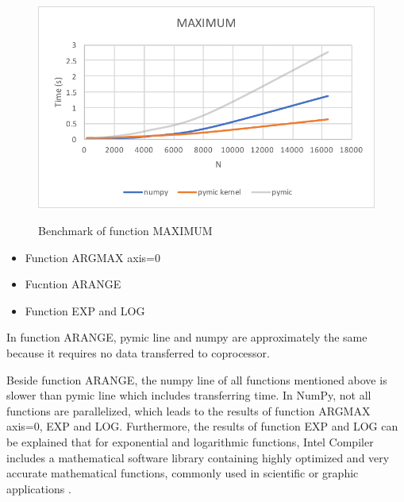  \begin{figure}
 \centering
 \includegraphics[scale=0.5]{img/group2/maximum.pdf}
 \label{fig:group2}
 \caption{Benchmark of function MAXIMUM}
 \end{figure}

\begin{itemize}
	\item Function ARGMAX axis=0
	\item Fucntion ARANGE
	\item Function EXP and LOG
\end{itemize}

In function ARANGE, pymic line and numpy are approximately the same because it requires no data transferred to coprocessor. 

Beside function ARANGE, the numpy line of all functions mentioned above is slower than pymic line which includes transferring time. In NumPy, not all functions are parallelized, which leads to the results of function ARGMAX axis=0, EXP and LOG. Furthermore, the results of function EXP and LOG can be explained that for exponential and logarithmic functions, Intel Compiler includes a mathematical software library containing highly optimized and very accurate mathematical functions, commonly used in scientific or graphic applications \cite{mathlib}.

